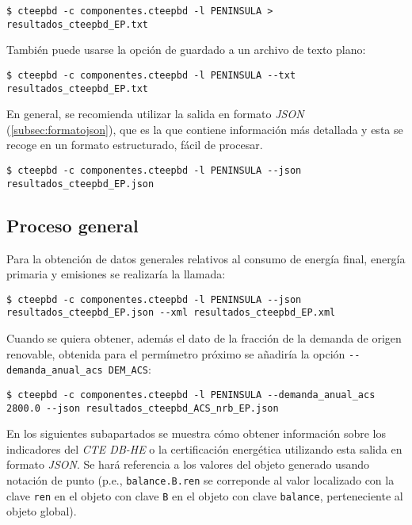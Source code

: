 \documentclass[10pt,notitlepage,oneside,a4paper]{article}
\begin{document}
\begin{Verbatim}[fontsize=\small]
    $ cteepbd -c componentes.cteepbd -l PENINSULA > resultados_cteepbd_EP.txt
\end{Verbatim}

También puede usarse la opción de guardado a un archivo de texto plano:

\begin{Verbatim}[fontsize=\small]
    $ cteepbd -c componentes.cteepbd -l PENINSULA --txt resultados_cteepbd_EP.txt
\end{Verbatim}

En general, se recomienda utilizar la salida en formato \textit{JSON} (\autoref{subsec:formatojson}), que es la que contiene información más detallada y esta se recoge en un formato estructurado, fácil de procesar.

\begin{Verbatim}[fontsize=\small]
    $ cteepbd -c componentes.cteepbd -l PENINSULA --json resultados_cteepbd_EP.json
\end{Verbatim}

\subsection{Proceso general}

Para la obtención de datos generales relativos al consumo de energía final, energía primaria y emisiones se realizaría la llamada:

\begin{Verbatim}[fontsize=\small]
    $ cteepbd -c componentes.cteepbd -l PENINSULA --json resultados_cteepbd_EP.json --xml resultados_cteepbd_EP.xml
\end{Verbatim}

Cuando se quiera obtener, además el dato de la fracción de la demanda de origen renovable, obtenida para el permímetro próximo se añadiría la opción \texttt{-{}-demanda\_anual\_acs DEM\_ACS}:

\begin{Verbatim}[fontsize=\small]
    $ cteepbd -c componentes.cteepbd -l PENINSULA --demanda_anual_acs 2800.0 --json resultados_cteepbd_ACS_nrb_EP.json
\end{Verbatim}

En los siguientes subapartados se muestra cómo obtener información sobre los indicadores del \textit{CTE DB-HE} o la certificación energética utilizando esta salida en formato \textit{JSON}. Se hará referencia a los valores del objeto generado usando notación de punto (p.e., \texttt{balance.B.ren} se correponde al valor localizado con la clave \texttt{ren} en el objeto con clave \texttt{B} en el objeto con clave \texttt{balance}, perteneciente al objeto global).
\end{document}
